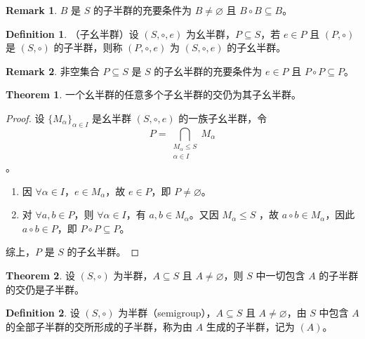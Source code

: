 \documentclass[oneside]{book}
\theoremstyle{definition}
\newtheorem{definition}{Definition}[section]
\newtheorem{theorem}{Theorem}[section]
\newtheorem{remark}{Remark}[section]
\begin{document}
\begin{remark}
	\( B \) 是 \( S \) 的子半群的充要条件为 \( B \neq \varnothing \) 且 \( B \circ B \subseteq B \)。
\end{remark}

\begin{definition}
	（子幺半群）设 \( (S, \circ, e) \) 为幺半群，\( P \subseteq S \)，若 \( e \in P \) 且 \( (P, \circ) \) 是 \( (S, \circ) \) 的子半群，则称 \( (P, \circ, e) \) 为 \( (S, \circ, e) \) 的子幺半群。
\end{definition}

\begin{remark}
	非空集合 \( P \subseteq S \) 是 \( S \) 的子幺半群的充要条件为 \( e \in P \) 且 \( P \circ P \subseteq P \)。
\end{remark}

\begin{theorem}
	一个幺半群的任意多个子幺半群的交仍为其子幺半群。
\end{theorem}

\begin{proof}
	设 \( \{M_\alpha\}_{\alpha \in I} \) 是幺半群 \( (S, \circ, e) \) 的一族子幺半群，令 \[ P = \bigcap_{\substack{M_\alpha \leq S  \\  \alpha \in I}} M_\alpha \]。
	\begin{enumerate}
		\item 因 \( \forall \alpha \in I \)，\( e \in M_\alpha \)，故 \( e \in P \)，即 \( P \neq \varnothing \)。
		\item 对 \( \forall a, b \in P \)，则 \( \forall \alpha \in I \)，有 \( a, b \in M_\alpha \)。又因 \( M_\alpha\leq S \) ，故 \( a \circ b \in M_\alpha \)，因此 \( a \circ b \in P \)，即 \( P \circ P \subseteq P \)。
	\end{enumerate}
	综上，\( P \) 是 \( S \) 的子幺半群。
\end{proof}


\begin{theorem}
	设 \( (S, \circ) \) 为半群，\( A \subseteq S \) 且 \( A \neq \varnothing \)，则 \( S \) 中一切包含 \( A \) 的子半群的交仍是子半群。
\end{theorem}

\begin{definition}
	设 \( (S, \circ) \) 为半群（semigroup），\( A \subseteq S \) 且 \( A \neq \varnothing \)，由 \( S \) 中包含 \( A \) 的全部子半群的交所形成的子半群，称为由 \( A \) 生成的子半群，记为 \(  (A) \)。
\end{definition}
\end{document}
